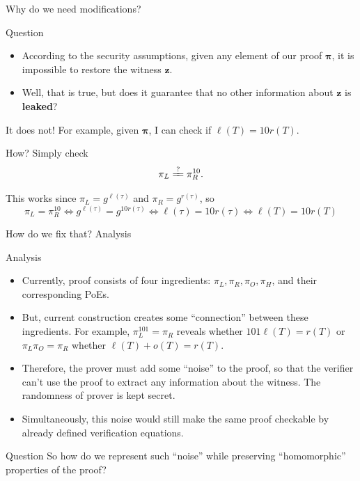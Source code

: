 \documentclass{zkdl-presentation-template}
\begin{document}
    \begin{frame}{Why do we need modifications?}
        \begin{questionblock}{Question}
            \begin{itemize}[label=]
                \item According to the security assumptions, given any element of our proof $\boldsymbol{\pi}$, it is impossible to restore the witness $\mathbf{z}$.\pause
                \item Well, that is true, but does it guarantee that no other information about $\mathbf{z}$ is \textbf{leaked}?\pause
            \end{itemize}

            It does not! For example, given $\boldsymbol{\pi}$, I can check if $\ell(T) = 10r(T)$. \pause

            How? Simply check
            \begin{equation*}
                \pi_L \xlongequal{?} \pi_R^{10}.
            \end{equation*}
            \pause

            This works since $\pi_L = g^{\ell(\tau)}$ and $\pi_R = g^{r(\tau)}$, so
            \begin{equation*}
                \pi_L = \pi_R^{10} \Leftrightarrow g^{\ell(\tau)} = g^{10r(\tau)} \Leftrightarrow \ell(\tau) = 10r(\tau) \Leftrightarrow \ell(T) = 10r(T)
            \end{equation*}
        \end{questionblock}
    \end{frame}

    \begin{frame}{How do we fix that? Analysis}
        \begin{block}{Analysis}
            \begin{itemize}[label=]
                \item Currently, proof consists of four ingredients: $\pi_L, \pi_R, \pi_O, \pi_H$, and their corresponding PoEs. \pause
                \item But, current construction creates some ``connection'' between these ingredients. For example, $\pi_L^{101} = \pi_R$ reveals whether $101\ell(T)=r(T)$ or $\pi_L\pi_O=\pi_R$ whether $\ell(T) + o(T) = r(T)$. \pause
                \item Therefore, the prover must add some ``noise'' to the proof, so that the verifier can't use the proof to extract any information about the witness. The randomness of prover is kept secret. \pause
                \item Simultaneously, this noise would still make the same proof checkable by already defined verification equations.
            \end{itemize}
        \end{block}
        \pause

        \begin{questionblock}{Question}
            So how do we represent such ``noise'' while preserving ``homomorphic'' properties of the proof?
        \end{questionblock}
    \end{frame}
\end{document}

